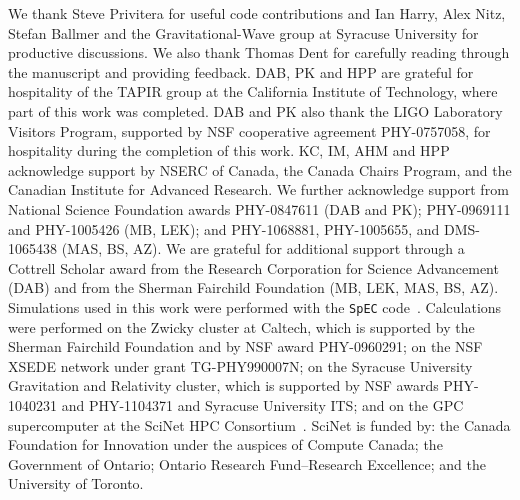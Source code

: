 \documentclass[aps,
prd,
twocolumn,
superscriptaddress,
lengthcheck,showpacs,letterpaper,nofootinbib,
floatfix]{revtex4-1}
\begin{document}
We thank Steve Privitera for useful code contributions and Ian Harry,
Alex Nitz, Stefan Ballmer and the Gravitational-Wave group at Syracuse
University for productive discussions. We also thank Thomas Dent for
carefully reading through the manuscript and providing feedback.
%
DAB, PK and HPP are grateful for hospitality of the TAPIR
group at the California Institute of Technology, where part of this
work was completed.  DAB and PK also thank the LIGO Laboratory
Visitors Program, supported by NSF cooperative agreement PHY-0757058,
for hospitality during the completion of this
work.
%
KC, IM, AHM and HPP acknowledge support by NSERC of Canada, the Canada
Chairs Program, and the Canadian Institute for Advanced Research.  We
further acknowledge support from National Science Foundation awards
PHY-0847611 (DAB and PK); PHY-0969111 and PHY-1005426 (MB, LEK); and
PHY-1068881, PHY-1005655, and DMS-1065438 (MAS, BS, AZ).  We are
grateful for additional support through a Cottrell Scholar award from the
Research Corporation for Science Advancement (DAB) and from the Sherman
Fairchild Foundation (MB, LEK, MAS, BS, AZ).
%
Simulations used in this work were performed with the \texttt{SpEC}
code~\cite{spec}.  Calculations were performed on the Zwicky cluster
at Caltech, which is supported by the Sherman Fairchild Foundation and
by NSF award PHY-0960291; on the NSF XSEDE network under grant
TG-PHY990007N; on the Syracuse University Gravitation and Relativity
cluster, which is supported by NSF awards PHY-1040231 and PHY-1104371
and Syracuse University ITS; and on the GPC supercomputer at the
SciNet HPC Consortium~\cite{scinet}. SciNet is funded by: the Canada
Foundation for Innovation under the auspices of Compute Canada; the
Government of Ontario; Ontario Research Fund--Research Excellence; and
the University of Toronto.  
\FloatBarrier


\end{document}
